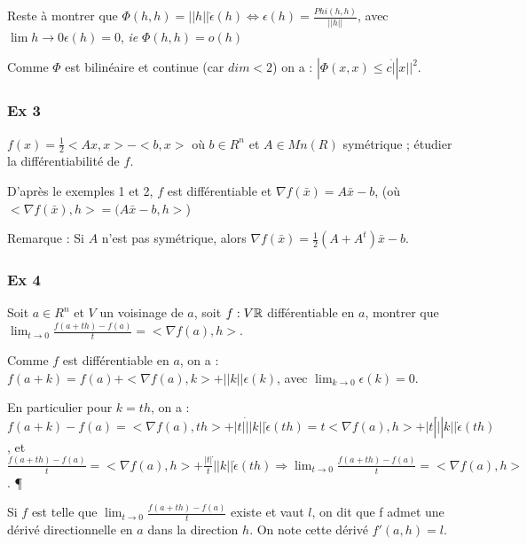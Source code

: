 		Reste à montrer que $\Phi(h, h) = ||h|| \dot \epsilon (h) \Leftrightarrow \epsilon (h) = \frac{ Phi(h, h) }{ ||h|| }$, avec $\lim{h \rightarrow 0} \epsilon (h) = 0$, \textit{ie} $\Phi(h, h) = o(h)$
		
		Comme $\Phi$ est bilinéaire et continue (car $dim < 2$) on a : $| \Phi (x, x) \leq c \dot ||x||^2$.
		
		
		\subsubsection{Ex 3}
		
		$f(x) = \frac{1}{2} <Ax, x> - <b, x>$ où $b \in R^n$ et $A \in Mn(R)$ symétrique ; étudier la différentiabilité de $f$.
		
		D'après le exemples 1 et 2, $f$ est différentiable et $\nabla f(\bar{x}) = A \bar{x} - b$, (où $<\nabla f(\bar{x}), h> = (A \bar{x} -b, h>$)
		
		Remarque : Si $A$ n'est pas symétrique, alors $\nabla f(\bar{x}) = \frac{1}{2} (A+A^t) \bar{x} - b$.
		
		\subsubsection{Ex 4}
		
		Soit $a \in R^n$ et $V$ un voisinage de $a$, soit $f:V \mathbb{R}$ différentiable en $a$, montrer que $\lim_{t \rightarrow 0} \frac{ f(a+th) - f(a) }{ t } = <\nabla f(a), h>$.
		
		Comme $f$ est différentiable en $a$, on a : $f(a+k) = f(a) + <\nabla f(a), k> + ||k|| \epsilon (k)$, avec $\lim_{k \rightarrow 0} \epsilon (k) = 0$.
		
		En particulier pour $k=th$, on a : $f(a+k) - f(a) = <\nabla f(a), th> + |t| \dot ||k|| \dot \epsilon (th) =  t <\nabla f(a), h> + |t| \dot ||k|| \dot \epsilon (th)$, et $\frac{ f(a+th) - f(a) }{ t } = <\nabla f(a), h> + \frac{|t|}{t} \dot ||k|| \dot \epsilon (th) \Rightarrow \lim_{t \rightarrow 0} \frac{ f(a+th) - f(a) }{ t } = < \nabla f(a), h>$. \P
		
		Si $f$ est telle que $\lim_{t \rightarrow 0} \frac{ f(a+th)-f(a) }{t}$ existe et vaut $l$, on dit que f admet une dérivé directionnelle en $a$ dans la direction $h$. On note cette dérivé $f'(a, h) = l$.
		
